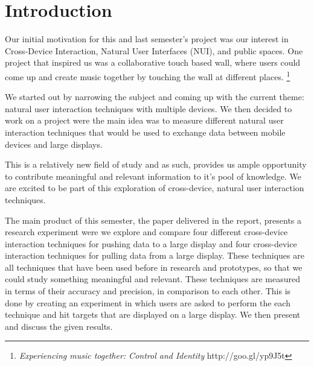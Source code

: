 \section*{Introduction}\label{sec:introduction}
Our initial motivation for this and last semester's project was our interest in Cross-Device Interaction, Natural User Interfaces (NUI), and public spaces.
One project that inspired us was a collaborative touch based wall, where users could come up and create music together by touching the wall at different places. \footnote{\textit{Experiencing music together: Control and Identity} http://goo.gl/yp9J5t}

We started out by narrowing the subject and coming up with the current theme: natural user interaction techniques with multiple devices. 
We then decided to work on a project were the main idea was to measure different natural user interaction techniques that would be used to exchange data between mobile devices and large displays. 

This is a relatively new field of study and as such, provides us ample opportunity to contribute meaningful and relevant information to it's pool of knowledge. 
We are excited to be part of this exploration of cross-device, natural user interaction techniques. 

The main product of this semester, the paper delivered in the report, presents a research experiment were we explore and compare four different cross-device interaction techniques for pushing data to a large display and four cross-device interaction techniques for pulling data from a large display. 
These techniques are all techniques that have been used before in research and prototypes, so that we could study something meaningful and relevant.
These techniques are measured in terms of their accuracy and precision, in comparison to each other.
This is done by creating an experiment in which users are asked to perform the each technique and hit targets that are displayed on a large display.
We then present and discuss the given results. 